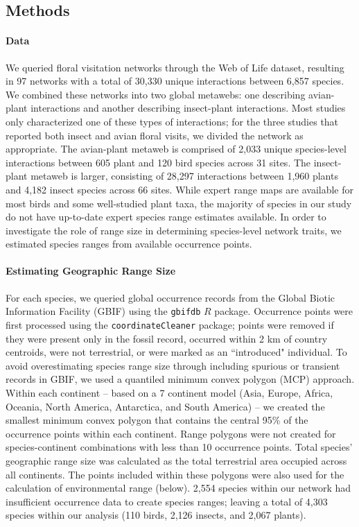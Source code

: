 \documentclass[12pt]{article}
\begin{document}
\subsection*{Methods}

\paragraph*{Data}
We queried floral visitation networks through the Web of Life dataset, resulting in 97 networks with a total of 30,330 unique interactions between 6,857 species. We combined these networks into two global metawebs: one describing avian-plant interactions and another describing insect-plant interactions. Most studies only characterized one of these types of interactions; for the three studies that reported both insect and avian floral visits, we divided the network as appropriate. The avian-plant metaweb is comprised of 2,033 unique species-level interactions between 605 plant and 120 bird species across 31 sites. The insect-plant metaweb is larger, consisting of 28,297 interactions between 1,960 plants and 4,182 insect species across 66 sites. While expert range maps are available for most birds and some well-studied plant taxa, the majority of species in our study do not have up-to-date expert species range estimates available. In order to investigate the role of range size in determining species-level network traits, we estimated species ranges from available occurrence points. 

\paragraph*{Estimating Geographic Range Size}
For each species, we queried global occurrence records from the Global Biotic Information Facility (GBIF) using the \texttt{gbifdb} $R$ package. Occurrence points were first processed using the \texttt{coordinateCleaner} package; points were removed if they were present only in the fossil record, occurred within 2 km of country centroids, were not terrestrial, or were marked as an ``introduced" individual. To avoid overestimating species range size through including spurious or transient records in GBIF, we used a quantiled minimum convex polygon (MCP) approach. Within each continent -- based on a 7 continent model (Asia, Europe, Africa, Oceania, North America, Antarctica, and South America) -- we created the smallest minimum convex polygon that contains the central 95\% of the occurrence points within each continent. Range polygons were not created for species-continent combinations with less than 10 occurrence points. Total species' geographic range size was calculated as the total terrestrial area occupied across all continents. The points included within these polygons were also used for the calculation of environmental range (below). 2,554 species within our network had insufficient occurrence data to create species ranges; leaving a total of 4,303 species within our analysis (110 birds, 2,126 insects, and 2,067 plants). 
\end{document}
